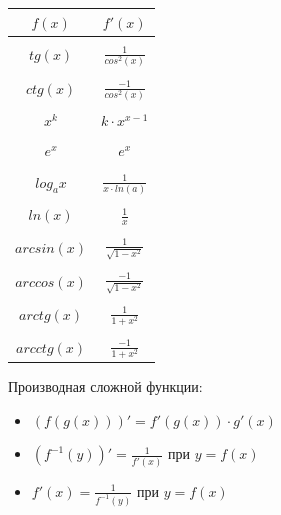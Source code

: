 \documentclass[oneside]{book}
\begin{document}
\begin{enumerate}
\begin{center}
      \begin{tabular}{c|c}
        $f(x)$ & $f'(x)$ \\
        \hline \\
        $tg(x)$ & $\frac{1}{cos^2(x)}$ \\
          \hline \\
        $ctg(x)$ & $\frac{-1}{cos^2(x)}$ \\
          \hline \\
        $x^k$ & $k \cdot x^{x-1}$ \\
          \hline \\
        $e^x$ & $e^x$ \\
          \hline \\
        $log_a x$ & $\frac{1}{x \cdot ln(a)}$ \\
          \hline \\
        $ln(x)$ & $\frac{1}{x}$ \\
          \hline \\
        $arcsin(x)$ & $\frac{1}{\sqrt{1 - x^2}}$ \\
          \hline \\
        $arccos(x)$ & $\frac{-1}{\sqrt{1 - x^2}}$ \\
          \hline \\
        $arctg(x)$ & $\frac{1}{1 + x^2}$ \\
          \hline \\
        $arcctg(x)$ & $\frac{-1}{1 + x^2}$ \\
      \end{tabular}
  \end{center}
Производная сложной функции:
\begin{itemize}
  \item $(f(g(x)))' = f'(g(x)) \cdot g'(x)$
  \item $(f^{-1}(y))' = \frac{1}{f'(x)}$ при $y = f(x)$
  \item $f'(x) = \frac{1}{f^{-1}(y)}$ при $y = f(x)$
\end{itemize}

\setcounter{chapter}{17}


\end{enumerate}
\end{document}

